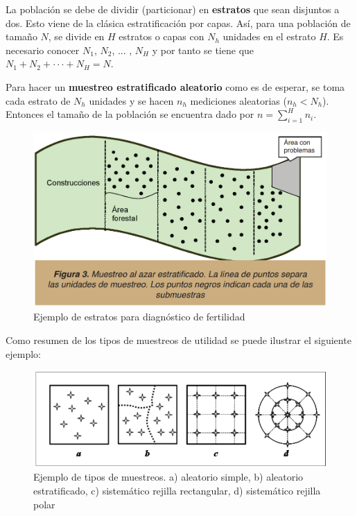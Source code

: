 \documentclass{report}
\begin{document}
La población se debe de dividir (particionar) en \textbf{estratos} que sean disjuntos a dos. Esto viene de la clásica estratificación por capas. Así, para una población de tamaño $N$, se divide en $H$ estratos o capas con $N_h$ unidades en el estrato $H$. Es necesario conocer $N_1$, $N_2$, ... , $N_H$ y por tanto se tiene que $N_1 + N_2 + \cdot \cdot \cdot + N_H = N$.

\bigbreak

Para hacer un \textbf{muestreo estratificado aleatorio} como es de esperar, se toma cada estrato de $N_h$ unidades y se hacen $n_h$ mediciones aleatorias ($n_h < N_h$). Entonces el tamaño de la población se encuentra dado por $n = \sum_{i=1}^H n_i$.

\bigbreak

\begin{figure}[H]
    \centering
    \includegraphics[width=0.5\paperwidth]{ref/stratified-sampling-examples.png}
    \caption{Ejemplo de estratos para diagnóstico de fertilidad \cite{lassaga-2011}}
\end{figure}

Como resumen de los tipos de muestreos de utilidad se puede ilustrar el siguiente ejemplo:

\begin{figure}[H]
    \centering
    \includegraphics[width=0.5\paperwidth]{ref/kind-of-samplings-example.png}
    \caption{Ejemplo de tipos de muestreos. a) aleatorio simple, b) aleatorio estratificado, c) sistemático rejilla rectangular, d) sistemático rejilla polar \cite{unknown-author-2007}}
\end{figure}
\end{document}
